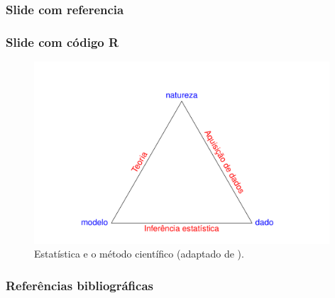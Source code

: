 \documentclass[handout,serif, professionalfont, usenames, dvipsnames, aspectratio = 169]{beamer}\usepackage[]{graphicx}\usepackage[]{color}
\newenvironment{knitrout}{}{} %
\begin{document}

\begin{frame}
  \frametitle{Slide com referencia}

\cite{diggle+chetwynd:2011}

\end{frame}


\begin{frame}[fragile]
\frametitle{Slide com código R}

\begin{knitrout}
\color{fgcolor}\begin{figure}

{\centering \includegraphics[width=11cm,height=0.75\textheight]{figure/unnamed-chunk-2-1} 

}

\caption{Estatística e o método científico (adaptado de \cite{diggle+chetwynd:2011}).}\label{fig:unnamed-chunk-2}
\end{figure}


\end{knitrout}
\end{frame}


\begin{frame}[fragile]
  \frametitle{Referências bibliográficas}
  
  \begin{tiny}
    
  \end{tiny}
  
\end{frame}
\end{document}
